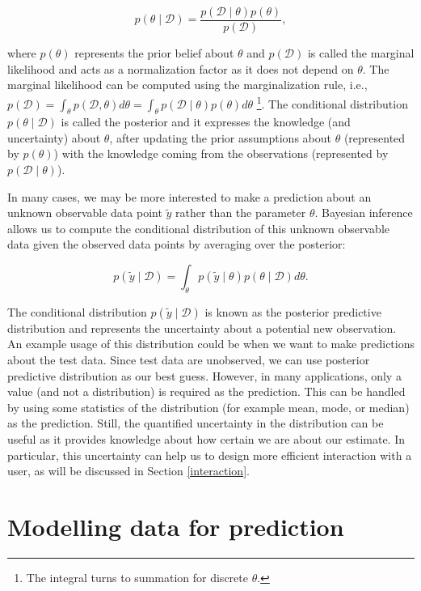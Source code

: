\documentclass[dissertation,math,vertlayout,pdfa,colorlinks]{aaltoseries}
\newcommand{\bD}{\mathcal{D}}
\begin{document}
\begin{equation}\label{Eq:Bayes}
p(\theta \mid \bD) = \frac{p(\bD \mid \theta)p(\theta)}{p(\bD)},
\end{equation}  

\noindent where $p(\theta)$ represents the prior belief about $\theta$ and $p(\bD)$ is called the marginal likelihood and acts as a normalization factor as it does not depend on $\theta$. The marginal likelihood can be computed using the marginalization rule, i.e., $p(\bD)= \int_{\theta} p(\bD, \theta)d\theta= \int_{\theta} p(\bD \mid \theta)p(\theta) d\theta$ \footnote{The integral turns to summation for discrete $\theta$.}. The conditional distribution $p(\theta \mid \bD)$ is called the posterior and it expresses the knowledge (and uncertainty) about $\theta$, after updating the prior assumptions about $\theta$ (represented by $p(\theta)$) with the knowledge coming from the observations (represented by $p(\bD \mid \theta)$).  

In many cases, we may be more interested to make a prediction about an unknown observable data point $\tilde{y}$ rather than the parameter $\theta$. Bayesian inference allows us to compute the conditional distribution of this unknown observable data given the observed data points by averaging over the posterior: 

\begin{equation}
p(\tilde{y} \mid\bD ) = \int_{\theta} p(\tilde{y}  \mid \theta)p(\theta \mid \bD)d\theta. 
\end{equation}

\noindent The conditional distribution $p(\tilde{y} \mid \bD)$ is known as the posterior predictive distribution and represents the uncertainty about a potential new observation. An example usage of this distribution could be when we want to make predictions about the test data. Since test data are unobserved, we can use posterior predictive distribution as our best guess. However, in many applications, only a value (and not a distribution) is required as the prediction. This can be handled by using some statistics of the distribution (for example mean, mode, or median) as the prediction. Still, the quantified uncertainty in the distribution can be useful as it provides knowledge about how certain we are about our estimate. In particular, this uncertainty can help us to design more efficient interaction with a user, as will be discussed in Section \ref{interaction}.

	

\section{Modelling data for prediction} \label{prob_model_data}
\end{document}
